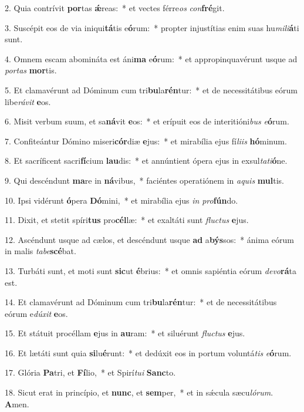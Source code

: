 2. Quia contrívit \textbf{por}tas \textbf{ǽ}reas:~*  et vectes férre\textit{os} \textit{con}\textbf{fré}git.\

3. Suscépit eos de via iniqui\textbf{tá}tis e\textbf{ó}rum:~*  propter injustítias enim suas hu\textit{mi}\textit{li}\textbf{á}ti sunt.\

4. Omnem escam abomináta est áni\textbf{ma} e\textbf{ó}rum:~*  et appropinquavérunt usque ad \textit{por}\textit{tas} \textbf{mor}tis.\

5. Et clamavérunt ad Dóminum cum tri\textbf{bu}la\textbf{rén}tur:~*  et de necessitátibus eórum libe\textit{rá}\textit{vit} \textbf{e}os.\

6. Misit verbum suum, et sa\textbf{ná}vit \textbf{e}os:~*  et erípuit eos de interitióni\textit{bus} \textit{e}\textbf{ó}rum.\

7. Confiteántur Dómino miseri\textbf{cór}diæ \textbf{e}jus:~*  et mirabília ejus fí\textit{li}\textit{is} \textbf{hó}minum.\

8. Et sacríficent sacri\textbf{fí}cium \textbf{lau}dis:~*  et annúntient ópera ejus in exsul\textit{ta}\textit{ti}\textbf{ó}ne.\

9. Qui descéndunt \textbf{ma}re in \textbf{ná}vibus,~*  faciéntes operatiónem in \textit{a}\textit{quis} \textbf{mul}tis.\

10. Ipsi vidérunt \textbf{ó}pera \textbf{Dó}mini,~*  et mirabília ejus \textit{in} \textit{pro}\textbf{fún}do.\

11. Dixit, et stetit spíri\textbf{tus} pro\textbf{cél}læ:~*  et exaltáti sunt \textit{fluc}\textit{tus} \textbf{e}jus.\

12. Ascéndunt usque ad cælos, et descéndunt usque \textbf{ad} a\textbf{býs}sos:~*  ánima eórum in malis \textit{ta}\textit{be}\textbf{scé}bat.\

13. Turbáti sunt, et moti sunt \textbf{sic}ut \textbf{é}brius:~*  et omnis sapiéntia eórum \textit{de}\textit{vo}\textbf{rá}ta est.\

14. Et clamavérunt ad Dóminum cum tri\textbf{bu}la\textbf{rén}tur:~*  et de necessitátibus eórum e\textit{dú}\textit{xit} \textbf{e}os.\

15. Et státuit procéllam \textbf{e}jus in \textbf{au}ram:~*  et siluérunt \textit{fluc}\textit{tus} \textbf{e}jus.\

16. Et lætáti sunt quia \textbf{si}lu\textbf{é}runt:~*  et dedúxit eos in portum voluntá\textit{tis} \textit{e}\textbf{ó}rum.\

17. Glória \textbf{Pa}tri, et \textbf{Fí}lio,~*  et Spirí\textit{tu}\textit{i} \textbf{Sanc}to.\

18. Sicut erat in princípio, et \textbf{nunc}, et \textbf{sem}per,~*  et in sǽcula sæcu\textit{ló}\textit{rum}. \textbf{A}men.\

